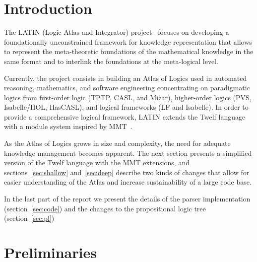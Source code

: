 
\newcommand{\ttt}[1]{{\tt #1}}

\section{Introduction}

The LATIN (Logic Atlas and Integrator) project~\cite{LATIN:url} focuses on developing a foundationally unconstrained framework for knowledge representation that allows to represent the meta-theoretic foundations of the mathematical knowledge in the same format and to interlink the foundations at the meta-logical level. 

Currently, the project consists in building an Atlas of Logics used in automated reasoning, mathematics, and software engineering concentrating on paradigmatic logics from first-order logic (TPTP, CASL, and Mizar), higher-order logics (PVS, Isabelle/HOL, HasCASL), and logical frameworks (LF and Isabelle). In order to provide a comprehensive logical framework, LATIN extends the Twelf language with a module system inspired by MMT~\cite{RabKoh:WSMSML10}.

As the Atlas of Logics grows in size and complexity, the need for adequate knowledge management becomes apparent. The next section presents a simplified version of the Twelf language with the MMT extensions, and sections~\ref{sec:shallow} and~\ref{sec:deep} describe two kinds of changes that allow for easier understanding of the Atlas and increase sustainability of a large code base.\cite{TISCAF}

In the last part of the report we present the details of the parser implementation (section~\ref{sec:code}) and the changes to the propositional logic tree (section~\ref{sec:pl})


\section{Preliminaries}\label{sec:preliminaries}

